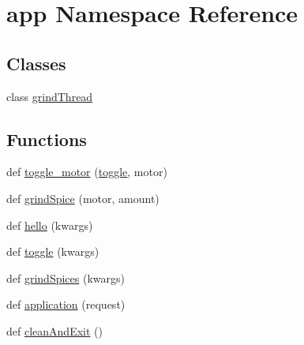 \hypertarget{namespaceapp}{}\section{app Namespace Reference}
\label{namespaceapp}
\subsection*{Classes}
\begin{DoxyCompactItemize}
\item 
class \hyperlink{classapp_1_1grindThread}{grind\+Thread}
\end{DoxyCompactItemize}
\subsection*{Functions}
\begin{DoxyCompactItemize}
\item 
def \hyperlink{namespaceapp_a054e9c9fd538521142c3890e9d6e1bae}{toggle\+\_\+motor} (\hyperlink{namespaceapp_a4d61f6d5a9aeb08ae13181297107d7a6}{toggle}, motor)
\item 
def \hyperlink{namespaceapp_a40b2b5477d802a2b7d4257ebf4a612de}{grind\+Spice} (motor, amount)
\item 
def \hyperlink{namespaceapp_a04f5d1537889f5aeceed816b282e5f86}{hello} (kwargs)
\item 
def \hyperlink{namespaceapp_a4d61f6d5a9aeb08ae13181297107d7a6}{toggle} (kwargs)
\item 
def \hyperlink{namespaceapp_ad822a127c02f22f50277d290eb04076e}{grind\+Spices} (kwargs)
\item 
def \hyperlink{namespaceapp_ae681b2776a4591b3bcaf2d21dad7f01f}{application} (request)
\item 
def \hyperlink{namespaceapp_ae8861cfed13033050a2b51b3c72b3453}{clean\+And\+Exit} ()
\end{DoxyCompactItemize}
